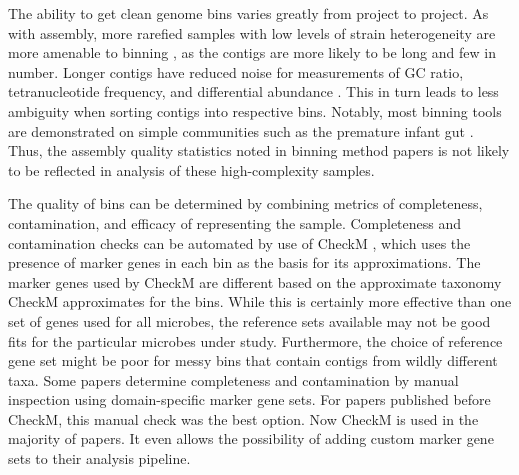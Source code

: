 The ability to get clean genome bins varies greatly from project to project.
As with assembly, more rarefied samples with low levels of strain heterogeneity are more amenable to binning \cite{kunin2008, thomas2012}, as the contigs are more likely to be long and few in number.
Longer contigs have reduced noise for measurements of GC ratio, tetranucleotide frequency, and differential abundance \cite{sangwan2016}.
This in turn leads to less ambiguity when sorting contigs into respective bins.
Notably, most binning tools are demonstrated on simple communities such as the premature infant gut \cite{sharon2013}.
Thus, the assembly quality statistics noted in binning method papers is not likely to be reflected in analysis of these high-complexity samples.

The quality of bins can be determined by combining metrics of completeness, contamination, and efficacy of representing the sample.
Completeness and contamination checks can be automated by use of CheckM \cite{parks2015}, which uses the presence of marker genes in each bin as the basis for its approximations.
The marker genes used by CheckM are different based on the approximate taxonomy CheckM approximates for the bins.
While this is certainly more effective than one set of genes used for all microbes, the reference sets available may not be good fits for the particular microbes under study.
Furthermore, the choice of reference gene set might be poor for messy bins that  contain contigs from wildly different taxa.
Some papers determine completeness and contamination by manual inspection using domain-specific marker gene sets. %
For papers published before CheckM, this manual check was the best option.
Now CheckM is used in the majority of papers.
It even allows the possibility of adding custom marker gene sets to their analysis pipeline.

